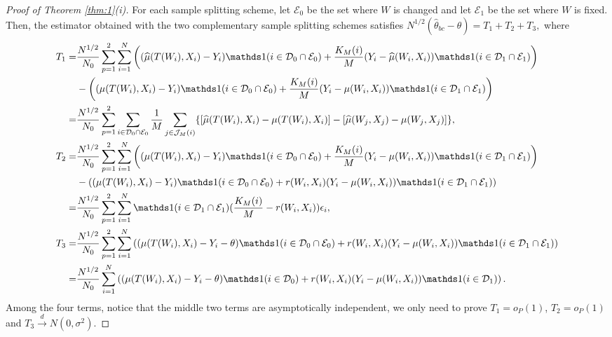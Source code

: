 \documentclass[11pt]{article}
\numberwithin{equation}{section}
\theoremstyle{definition}
\begin{document}
\begin{proof}[Proof of Theorem \ref{thm:1}(i)]
    For each sample splitting scheme, let $\mathcal{E}_0$ be the set where $W$ is changed and let $\mathcal{E}_1$ be the set where $W$ is fixed. Then, the estimator obtained with the two complementary sample splitting schemes satisfies $N^{1/2}(\widehat{\theta}_{bc}-\theta)=T_1+T_2+T_3,$ where
    \begin{align*}
        T_1=&\frac{N^{1/2}}{N_0}\sum_{p=1}^2\sum_{i=1}^N\left((\widehat{\mu}(T(W_i),X_i)-Y_i)\ind(i \in \mathcal{D}_0\cap\mathcal{E}_0)+\frac{K_M(i)}{M}(Y_{i}-\widehat{\mu}(W_{i},X_{i}))\ind(i \in \mathcal{D}_1\cap\mathcal{E}_1)\right)\\
        &-\left((\mu(T(W_i),X_i)-Y_i)\ind(i \in \mathcal{D}_0\cap\mathcal{E}_0)+\frac{K_M(i)}{M}(Y_{i}-\mu(W_{i},X_{i}))\ind(i \in \mathcal{D}_1\cap\mathcal{E}_1)\right)\\
        =&\frac{N^{1/2}}{N_0}\sum_{p=1}^2\sum_{i\in \mathcal{D}_0\cap\mathcal{E}_0}\frac{1}{M}\sum_{j\in\mathcal{J}_M(i)}\{[\widehat{\mu}(T(W_i),X_i)-\mu(T(W_i),X_i)]-[\widehat{\mu}(W_j,X_j)-\mu(W_j,X_j)]\},\\
        T_2=&\frac{N^{1/2}}{N_0}\sum_{p=1}^2\sum_{i=1}^N\left((\mu(T(W_i),X_i)-Y_i)\ind(i \in \mathcal{D}_0\cap\mathcal{E}_0)+\frac{K_M(i)}{M}(Y_{i}-\mu(W_{i},X_{i}))\ind(i \in \mathcal{D}_1\cap\mathcal{E}_1)\right)\\
        &-\left((\mu(T(W_i),X_i)-Y_i)\ind(i \in \mathcal{D}_0\cap\mathcal{E}_0)+r(W_i,X_i)(Y_{i}-\mu(W_{i},X_{i}))\ind(i \in \mathcal{D}_1\cap\mathcal{E}_1)\right)\\
        =&\frac{N^{1/2}}{N_0}\sum_{p=1}^2\sum_{i=1}^N\ind(i\in\mathcal{D}_1\cap\mathcal{E}_1)(\frac{K_M(i)}{M}-r(W_i,X_i))\epsilon_i,\\
        T_3=&\frac{N^{1/2}}{N_0}\sum_{p=1}^2\sum_{i=1}^N\left((\mu(T(W_i),X_i)-Y_i-\theta)\ind(i \in \mathcal{D}_0\cap\mathcal{E}_0)+r(W_i,X_i)(Y_{i}-\mu(W_{i},X_{i}))\ind(i \in \mathcal{D}_1\cap\mathcal{E}_1)\right)\\
        =&\frac{N^{1/2}}{N_0}\sum_{i=1}^N\left((\mu(T(W_i),X_i)-Y_i-\theta)\ind(i \in \mathcal{D}_0)+r(W_i,X_i)(Y_{i}-\mu(W_{i},X_{i}))\ind(i \in \mathcal{D}_1)\right).
    \end{align*}
    Among the four terms, notice that the middle two terms are asymptotically independent, we only need to prove $T_1=o_P(1)$, $T_2=o_P(1)$ and $T_3\overset{d}{\to}N(0,\sigma^2).$


\end{proof}
\end{document}
